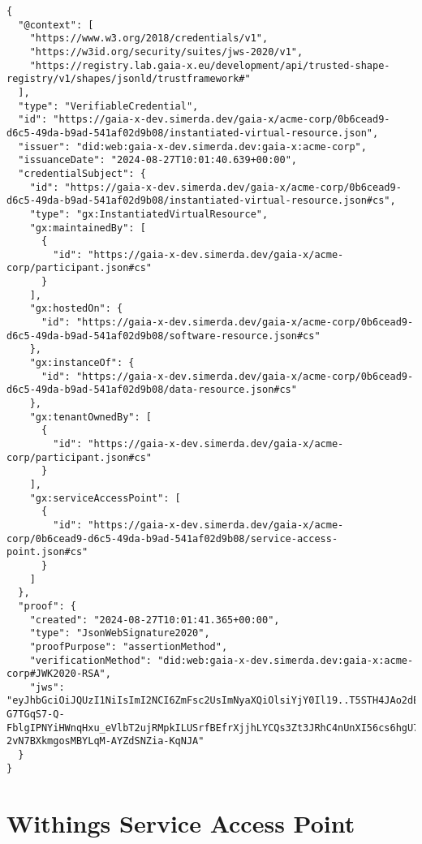 \begin{verbatim}
{
  "@context": [
    "https://www.w3.org/2018/credentials/v1",
    "https://w3id.org/security/suites/jws-2020/v1",
    "https://registry.lab.gaia-x.eu/development/api/trusted-shape-registry/v1/shapes/jsonld/trustframework#"
  ],
  "type": "VerifiableCredential",
  "id": "https://gaia-x-dev.simerda.dev/gaia-x/acme-corp/0b6cead9-d6c5-49da-b9ad-541af02d9b08/instantiated-virtual-resource.json",
  "issuer": "did:web:gaia-x-dev.simerda.dev:gaia-x:acme-corp",
  "issuanceDate": "2024-08-27T10:01:40.639+00:00",
  "credentialSubject": {
    "id": "https://gaia-x-dev.simerda.dev/gaia-x/acme-corp/0b6cead9-d6c5-49da-b9ad-541af02d9b08/instantiated-virtual-resource.json#cs",
    "type": "gx:InstantiatedVirtualResource",
    "gx:maintainedBy": [
      {
        "id": "https://gaia-x-dev.simerda.dev/gaia-x/acme-corp/participant.json#cs"
      }
    ],
    "gx:hostedOn": {
      "id": "https://gaia-x-dev.simerda.dev/gaia-x/acme-corp/0b6cead9-d6c5-49da-b9ad-541af02d9b08/software-resource.json#cs"
    },
    "gx:instanceOf": {
      "id": "https://gaia-x-dev.simerda.dev/gaia-x/acme-corp/0b6cead9-d6c5-49da-b9ad-541af02d9b08/data-resource.json#cs"
    },
    "gx:tenantOwnedBy": [
      {
        "id": "https://gaia-x-dev.simerda.dev/gaia-x/acme-corp/participant.json#cs"
      }
    ],
    "gx:serviceAccessPoint": [
      {
        "id": "https://gaia-x-dev.simerda.dev/gaia-x/acme-corp/0b6cead9-d6c5-49da-b9ad-541af02d9b08/service-access-point.json#cs"
      }
    ]
  },
  "proof": {
    "created": "2024-08-27T10:01:41.365+00:00",
    "type": "JsonWebSignature2020",
    "proofPurpose": "assertionMethod",
    "verificationMethod": "did:web:gaia-x-dev.simerda.dev:gaia-x:acme-corp#JWK2020-RSA",
    "jws": "eyJhbGciOiJQUzI1NiIsImI2NCI6ZmFsc2UsImNyaXQiOlsiYjY0Il19..T5STH4JAo2dEW092jmLGotTnrKhQsEk1jLVn2pzvDS3rwSnUJJzhB1jDCzTidRU9E-G7TGqS7-Q-FblgIPNYiHWnqHxu_eVlbT2ujRMpkILUSrfBEfrXjjhLYCQs3Zt3JRhC4nUnXI56cs6hgU7R1rZs_IC4E5M4puhpHN4k_5xY_yxqorCihSUCnQYdGcLcj9AdhRAP5fN6lIwgamJGerVcGO67iTx6tviJvYFPGOlV6o7AUlwF_R7exIuuMDzMDsoojaDhOq4W8QO79VwKM4S9DOcV7aBvh8e0hlienrOQEHZ4Iyaa-2vN7BXkmgosMBYLqM-AYZdSNZia-KqNJA"
  }
}
\end{verbatim}


\section{Withings Service Access Point}

